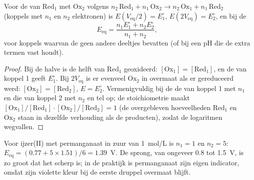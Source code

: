 \begin{proposition}\label{prop:b1:titration-methods:potentiometric-points}
Voor de  van $\mathrm{Red_1}$ met $\mathrm{Ox_2}$ volgens
$n_2\,\mathrm{Red_1} + n_1\,\mathrm{Ox_2} \to n_2\,\mathrm{Ox_1} +
n_1\,\mathrm{Red_2}$ (koppels met $n_1$ en $n_2$ elektronen) is $E(V_{\mathrm{eq}}/2) = E^\circ_1$, $E(2V_{\mathrm{eq}}) =
E^\circ_2$, en bij de 
\[
  E_{\mathrm{eq}} = \frac{n_1E^\circ_1 + n_2E^\circ_2}{n_1 + n_2},
\]
voor koppels waarvan de  geen andere deeltjes bevatten (of bij
een pH die de extra termen vast houdt).
\end{proposition}

\begin{proof}
Bij de halve  is de helft van $\mathrm{Red_1}$ geoxideerd:
$[\mathrm{Ox_1}] = [\mathrm{Red_1}]$, en de  van
koppel 1 geeft $E^\circ_1$. Bij $2V_{\mathrm{eq}}$ is er evenveel
$\mathrm{Ox_2}$ in overmaat als er gereduceerd werd:
$[\mathrm{Ox_2}] = [\mathrm{Red_2}]$, $E = E^\circ_2$. Vermenigvuldig bij
de  de  van koppel 1 met $n_1$ en die
van koppel 2 met $n_2$ en tel op; de stoichiometrie maakt
$[\mathrm{Ox_1}]/[\mathrm{Red_1}] \cdot [\mathrm{Ox_2}]/[\mathrm{Red_2}] = 1$
(de overgebleven hoeveelheden $\mathrm{Red_1}$ en $\mathrm{Ox_2}$ staan in
dezelfde verhouding als de producten), zodat de logaritmen wegvallen.
\end{proof}

Voor ijzer(II) met permanganaat in zuur van \qty{1}{mol/L} is $n_1 = 1$
en $n_2 =
5$: $E_{\mathrm{eq}} = (0.77 + 5 \times 1.51)/6 = 1.39$~V. De sprong, van
ongeveer 0.8 tot 1.5~V, is zo groot dat het  scherp is; in de
praktijk is permanganaat zijn eigen indicator, omdat zijn violette kleur
bij de eerste druppel overmaat blijft.

